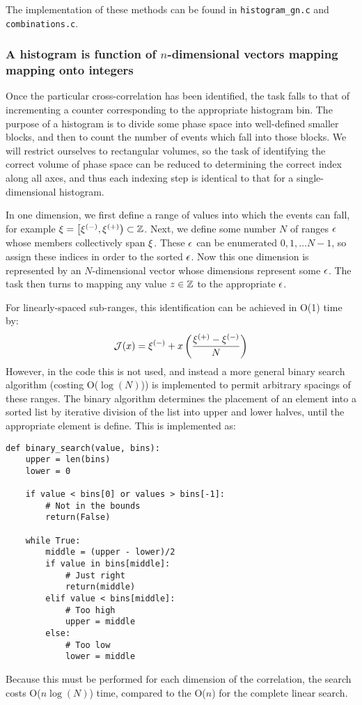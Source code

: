 The implementation of these methods can be found in \texttt{histogram\_gn.c} and \texttt{combinations.c}.

\subsubsection{A histogram is function of $n$-dimensional vectors mapping mapping onto integers}
Once the particular cross-correlation has been identified, the task falls to that of incrementing a counter corresponding to the appropriate histogram bin. The purpose of a histogram is to divide some phase space into well-defined smaller blocks, and then to count the number of events which fall into those blocks. We will restrict ourselves to rectangular volumes, so the task of identifying the correct volume of phase space can be reduced to determining the correct index along all axes, and thus each indexing step is identical to that for a single-dimensional histogram. 

In one dimension, we first define a range of values into which the events can fall, for example $\xi=\left[\xi^{(-)},\xi^{(+)}\right)\subset\mathbb{Z}$. Next, we define some number $N$ of ranges $\epsilon$ whose members collectively span $\xi$. These $\epsilon$ can be enumerated $0,1,\ldots N-1$, so assign these indices in order to the sorted $\epsilon$. Now this one dimension is represented by an $N$-dimensional vector whose dimensions represent some $\epsilon$. The task then turns to mapping any value $z\in\mathbb{Z}$ to the appropriate $\epsilon$.

For linearly-spaced sub-ranges, this identification can be achieved in O(1) time by:
\begin{equation}
\mathcal{J}(x) = \xi^{(-)} + x\left( \frac{\xi^{(+)}-\xi^{(-)}}{N} \right)
\end{equation}
However, in the code this is not used, and instead a more general binary search algorithm (costing O($\log(N)$)) is implemented to permit arbitrary spacings of these ranges. The binary algorithm determines the placement of an element into a sorted list by iterative division of the list into upper and lower halves, until the appropriate element is define. This is implemented as:
\begin{lstlisting}
def binary_search(value, bins):
    upper = len(bins)
    lower = 0
    
    if value < bins[0] or values > bins[-1]:
        # Not in the bounds
        return(False)
     
    while True:
        middle = (upper - lower)/2
        if value in bins[middle]:
            # Just right
            return(middle)
        elif value < bins[middle]:
            # Too high
            upper = middle
        else:
            # Too low
            lower = middle
\end{lstlisting}
Because this must be performed for each dimension of the correlation, the search costs O($n\log{(N)}$) time, compared to the O($n$) for the complete linear search. 

